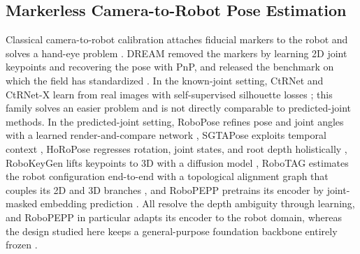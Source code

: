 \subsection{Markerless Camera-to-Robot Pose Estimation}
Classical camera-to-robot calibration attaches fiducial markers to the robot and solves a hand-eye problem \cite{garrido2014automatic,fiala2005artag,olson2011apriltag}. DREAM removed the markers by learning 2D joint keypoints and recovering the pose with PnP, and released the benchmark on which the field has standardized \cite{lee2020camera,lepetit2009ep}. In the known-joint setting, CtRNet and CtRNet-X learn from real images with self-supervised silhouette losses \cite{lu2023markerless,lu2025ctrnet}; this family solves an easier problem and is not directly comparable to predicted-joint methods. In the predicted-joint setting, RoboPose refines pose and joint angles with a learned render-and-compare network \cite{labbe2021single}, SGTAPose exploits temporal context \cite{tian2023robot}, HoRoPose regresses rotation, joint states, and root depth holistically \cite{ban2024real}, RoboKeyGen lifts keypoints to 3D with a diffusion model \cite{tian2024robokeygen}, RoboTAG estimates the robot configuration end-to-end with a topological alignment graph that couples its 2D and 3D branches \cite{liu2025robotag}, and RoboPEPP pretrains its encoder by joint-masked embedding prediction \cite{goswami2025robopepp}. All resolve the depth ambiguity through learning, and RoboPEPP in particular adapts its encoder to the robot domain, whereas the design studied here keeps a general-purpose foundation backbone entirely frozen \cite{simeoni2025dinov3}.

